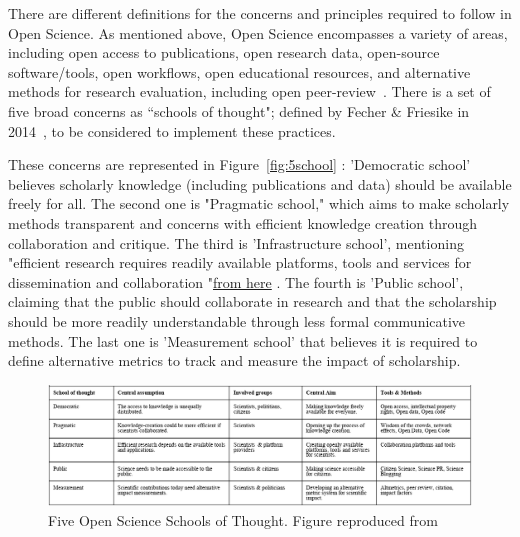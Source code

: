 There are different definitions for the concerns and principles required to follow in Open Science. As mentioned above, Open Science encompasses a variety of areas, including open access to publications, open research data, open-source software/tools, open workflows, open educational resources, and alternative methods for research evaluation, including open peer-review~\cite{pontika2015fostering}. There is a set of five broad concerns as ``schools of thought"; defined by Fecher \& Friesike in 2014~\cite{fecher2014open}, to be considered to implement these practices.

These concerns are represented in Figure~\ref{fig:5school} :  'Democratic school' believes scholarly knowledge (including publications and data) should be available freely for all. The second one is "Pragmatic school," which aims to make scholarly methods transparent and concerns with efficient knowledge creation through collaboration and critique. The third is 'Infrastructure school', mentioning "efficient research requires readily available platforms, tools and services for dissemination and collaboration "\href{https://open-science-training-handbook.gitbook.io/book/open-science-basics/open-concepts-and-principles}{from here} . The fourth is 'Public school', claiming that the public should collaborate in research and that the scholarship should be more readily understandable through less formal communicative methods. The last one is 'Measurement school' that believes it is required to define alternative metrics to track and measure the impact of scholarship.

\begin{figure}[ht]
  \centering
  \includegraphics[width=\textwidth]{figures/5schools.png}
  \caption{Five Open Science Schools of Thought. Figure reproduced from~\cite{fecher2014open} }
  \label{fig:5schools}
\end{figure} 


